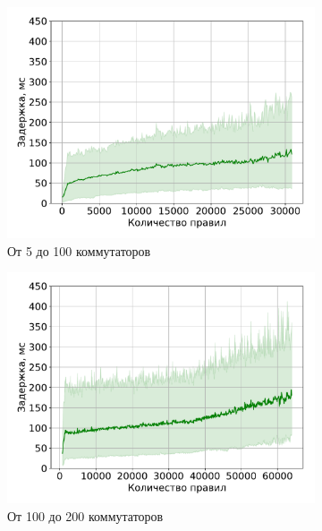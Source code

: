 \documentclass[../thesis.tex]{subfiles}
\begin{document}
\begin{figure}
\centering
\captionsetup{justification=centering,margin=2cm}
\begin{subfigure}[b]{0.49\textwidth}
  \centering
  \includegraphics[width=1.0\textwidth]{figures/experiments/delay_by_rules_0_100.pdf}
  \caption{От 5 до 100 коммутаторов} \label{fig:delay_by_rules_5_100}
\end{subfigure}
\begin{subfigure}[b]{0.49\textwidth}
  \centering
  \includegraphics[width=1.0\textwidth]{figures/experiments/delay_by_rules_100_200.pdf}
  \caption{От 100 до 200 коммутаторов} \label{fig:delay_by_rules_100_200}
\end{subfigure}
\begin{subfigure}[b]{0.49\textwidth}

\end{subfigure}
\end{figure}
\end{document}
